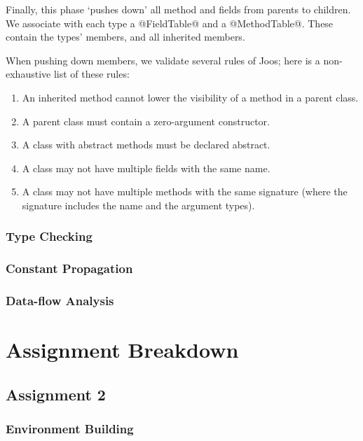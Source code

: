 \documentclass[12pt, titlepage]{article}
\begin{document}
Finally, this phase `pushes down' all method and fields from parents to
children. We associate with each type a @FieldTable@ and a @MethodTable@. These
contain the types' members, and all inherited members.

When pushing down members, we validate several rules of Joos; here is a
non-exhaustive list of these rules:
\begin{enumerate}
  \item An inherited method cannot lower the visibility of a method in a parent
  class.

  \item A parent class must contain a zero-argument constructor.

  \item A class with abstract methods must be declared abstract.

  \item A class may not have multiple fields with the same name.

  \item A class may not have multiple methods with the same signature (where
  the signature includes the name and the argument types).
\end{enumerate}

\subsubsection{Type Checking}\label{subsubsec:type-checking}

\subsubsection{Constant Propagation}\label{subsubsec:const-prop}

\subsubsection{Data-flow Analysis}\label{subsubsec:data-flow}

\section{Assignment Breakdown}\label{sec:assg}

\subsection{Assignment 2}

\subsubsection{Environment Building}
\end{document}
